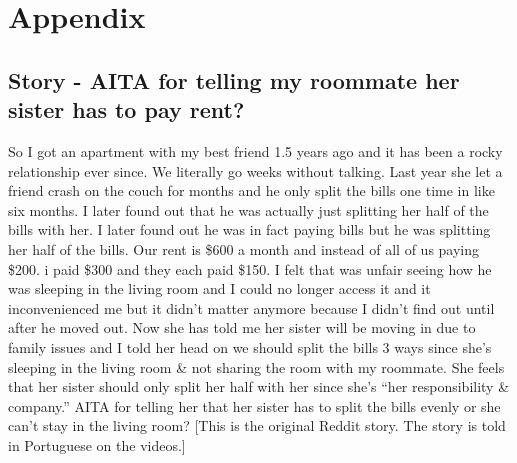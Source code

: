 \chapter*{Appendix}

\section{Story - AITA for telling my roommate her sister has to pay rent?}\label{appendix:story}
So I got an apartment with my best friend 1.5 years ago and it has been a rocky relationship ever since. We literally go weeks without talking. Last year she let a friend crash on the couch for months and he only split the bills one time in like six months. I later found out that he was actually just splitting her half of the bills with her. I later found out he was in fact paying bills but he was splitting her half of the bills. Our rent is \$600 a month and instead of all of us paying \$200. i paid \$300 and they each paid \$150. I felt that was unfair seeing how he was sleeping in the living room and I could no longer access it and it inconvenienced me but it didn’t matter anymore because I didn’t find out until after he moved out. Now she has told me her sister will be moving in due to family issues and I told her head on we should split the bills 3 ways since she’s sleeping in the living room \& not sharing the room with my roommate. She feels that her sister should only split her half with her since she’s “her responsibility \& company.” AITA for telling her that her sister has to split the bills evenly or she can’t stay in the living room?
[This is the original Reddit story. The story is told in Portuguese on the videos.]

\clearpage
